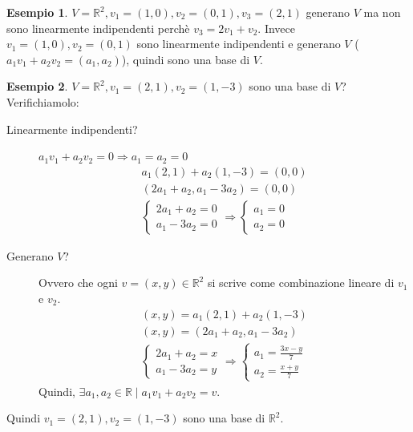 \documentclass[a4paper]{article}
\theoremstyle{definition}
\newtheorem*{es}{Esempio}
\begin{document}
\begin{es}
	$V = \mathbb{R}^2, v_1 = (1, 0), v_2 = (0, 1), v_3 = (2, 1)$ generano $V$ ma non sono linearmente indipendenti perchè $v_3 = 2v_1 + v_2$.
	Invece $v_1 = (1, 0), v_2 = (0, 1)$ sono linearmente indipendenti e generano $V$ ($a_1v_1 + a_2v_2 = (a_1, a_2)$), quindi sono una base di $V$.
\end{es}

\begin{es}
	$V = \mathbb{R}^2, v_1 = (2, 1), v_2 = (1, -3)$ sono una base di $V$? Verifichiamolo:
	\begin{description}
		\item[Linearmente indipendenti?] $a_1v_1 + a_2v_2 = 0 \Rightarrow a_1 = a_2 = 0$
		      \begin{align*}
			      a_1(2, 1) + a_2(1, -3) = (0, 0) \\
			      (2a_1 + a_2, a_1 - 3a_2) = (0, 0) \\
			      \begin{cases}
				      2a_1 + a_2 = 0 \\
				      a_1 - 3a_2 = 0
			      \end{cases}
			      \Rightarrow
			      \begin{cases}
				      a_1 = 0 \\
				      a_2 = 0
			      \end{cases}
		      \end{align*}
		\item[Generano $V$?] Ovvero che ogni $v = (x, y) \in \mathbb{R}^2$ si scrive come combinazione lineare di $v_1$ e $v_2$.
		      \begin{align*}
			      (x, y) = a_1(2, 1) + a_2(1, -3) \\
			      (x, y) = (2a_1 + a_2, a_1 - 3a_2) \\
			      \begin{cases}
				      2a_1 + a_2 = x \\
				      a_1 - 3a_2 = y
			      \end{cases}
			      \Rightarrow
			      \begin{cases}
				      a_1 = \frac{3x - y}{7} \\
				      a_2 = \frac{x + y}{7}
			      \end{cases}
		      \end{align*}
			  Quindi, $\exists a_1, a_2 \in \mathbb{R} \mid a_1v_1 + a_2v_2 = v$.
	\end{description}
	Quindi $v_1 = (2, 1), v_2 = (1, -3)$ sono una base di $\mathbb{R}^2$.
\end{es}
\end{document}
